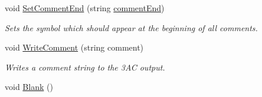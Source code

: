 \begin{DoxyCompactItemize}
\item 
void \hyperlink{classTAC__Generator_ad96d5a262c29a34a34324ed6c7aeffe1}{Set\-Comment\-End} (string \hyperlink{classTAC__Generator_a9f011cfb810ea2cd01b31b9a48762123}{comment\-End})
\begin{DoxyCompactList}\small\item\em Sets the symbol which should appear at the beginning of all comments. \end{DoxyCompactList}\item 
void \hyperlink{classTAC__Generator_a37a03e11321195b25600eb008b20b800}{Write\-Comment} (string comment)
\begin{DoxyCompactList}\small\item\em Writes a comment string to the 3\-A\-C output. \end{DoxyCompactList}\item 
\hypertarget{classTAC__Generator_a3351d9d0d43b7b33591ed556c0261b84}{void \hyperlink{classTAC__Generator_a3351d9d0d43b7b33591ed556c0261b84}{Blank} ()}\label{classTAC__Generator_a3351d9d0d43b7b33591ed556c0261b84}


\end{DoxyCompactItemize}
